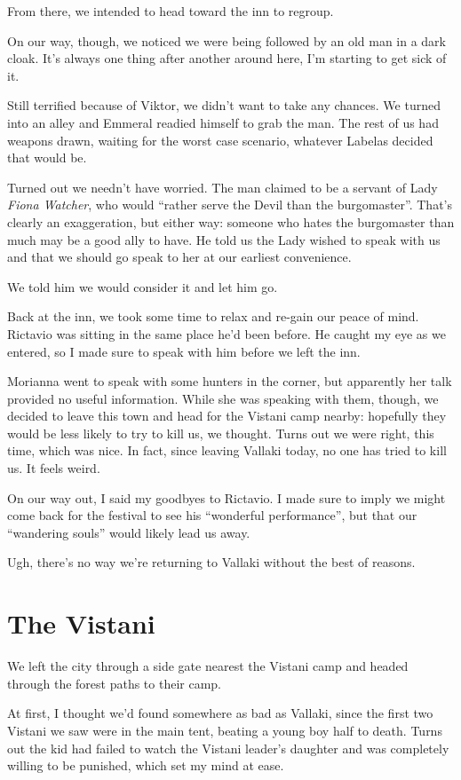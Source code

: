 From there, we intended to head toward the inn to regroup.

On our way, though, we noticed we were being followed by an old man in a dark cloak. It's always one thing after another around here, I'm starting to get sick of it.

Still terrified because of Viktor, we didn't want to take any chances. We turned into an alley and Emmeral readied himself to grab the man. The rest of us had weapons drawn, waiting for the worst case scenario, whatever Labelas decided that would be.

Turned out we needn't have worried. The man claimed to be a servant of Lady \emph{Fiona Watcher}, who would ``rather serve the Devil than the burgomaster''. That's clearly an exaggeration, but either way: someone who hates the burgomaster than much may be a good ally to have. He told us the Lady wished to speak with us and that   we should go speak to her at our earliest convenience.

We told him we would consider it and let him go.

Back at the inn, we took some time to relax and re-gain our peace of mind. Rictavio was sitting in the same place he'd been before. He caught my eye as we entered, so I made sure to speak with him before we left the inn.

Morianna went to speak with some hunters in the corner, but apparently her talk provided no useful information. While she was speaking with them, though, we decided to leave this town and head for the Vistani camp nearby: hopefully they would be less likely to try to kill us, we thought. Turns out we were right, this time, which was nice. In fact, since leaving Vallaki today, no one has tried to kill us. It feels weird.

On our way out, I said my goodbyes to Rictavio. I made sure to imply we might come back for the festival to see his ``wonderful performance'', but that our ``wandering souls'' would likely lead us away.

Ugh, there's no way we're returning to Vallaki without the best of reasons.

\section*{The Vistani}
We left the city through a side gate nearest the Vistani camp and headed through the forest paths to their camp.

At first, I thought we'd found somewhere as bad as Vallaki, since the first two Vistani we saw were in the main tent, beating a young boy half to death. Turns out the kid had failed to watch the Vistani leader's daughter and was completely willing to be punished, which set my mind at ease.

